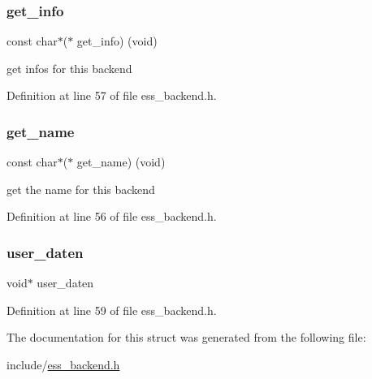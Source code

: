 \subsubsection{\texorpdfstring{get\+\_\+info}{get\_info}}
{\footnotesize\ttfamily const char$\ast$($\ast$  get\+\_\+info) (void)}

get infos for this backend 

Definition at line 57 of file ess\+\_\+backend.\+h.

\mbox{\label{structess__backend_a1e8975441f4fbb374da179cc7e8bcbae}} 
\subsubsection{\texorpdfstring{get\+\_\+name}{get\_name}}
{\footnotesize\ttfamily const char$\ast$($\ast$  get\+\_\+name) (void)}

get the name for this backend 

Definition at line 56 of file ess\+\_\+backend.\+h.

\mbox{\label{structess__backend_a5ad8569143b4728c7b7f91c53661d8b5}} 
\subsubsection{\texorpdfstring{user\+\_\+daten}{user\_daten}}
{\footnotesize\ttfamily void$\ast$ user\+\_\+daten}



Definition at line 59 of file ess\+\_\+backend.\+h.



The documentation for this struct was generated from the following file\+:\begin{DoxyCompactItemize}
\item 
include/\hyperlink{ess__backend_8h}{ess\+\_\+backend.\+h}\end{DoxyCompactItemize}
